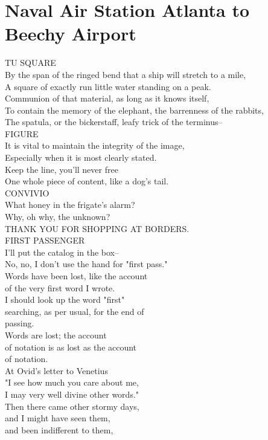\documentclass[smalldemyvopaper,11pt,twoside,onecolumn,openright,extrafontsizes]{memoir}
\begin{document}
\chapter{Naval Air Station Atlanta to Beechy Airport}
TU SQUARE
\\By the span of the ringed bend that a ship will stretch to a mile,
\\A square of exactly run little water standing on a peak.
\\Communion of that material, as long as it knows itself,
\\To contain the memory of the elephant, the barrenness of the rabbits,
\\The spatula, or the bickerstaff, leafy trick of the terminus--
\\FIGURE
\\It is vital to maintain the integrity of the image,
\\Especially when it is most clearly stated.
\\Keep the line, you'll never free
\\One whole piece of content, like a dog's tail.
\\CONVIVIO
\\What honey in the frigate's alarm?
\\Why, oh why, the unknown?
\\THANK YOU FOR SHOPPING AT BORDERS.
\\FIRST PASSENGER
\\I'll put the catalog in the box--
\\No, no, I don't use the hand for "first pass."
\\Words have been lost, like the account
\\of the very first word I wrote.
\\I should look up the word "first"
\\searching, as per usual, for the end of
\\passing.
\\Words are lost; the account
\\of notation is as lost as the account
\\of notation.
\\At Ovid's letter to Venetius
\\"I see how much you care about me,
\\I may very well divine other words."
\\Then there came other stormy days,
\\and I might have seen them,
\\and been indifferent to them,
\end{document}
